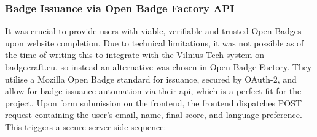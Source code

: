 \subsubsection{Badge Issuance via Open Badge Factory API}

It was crucial to provide users with viable, verifiable and trusted Open Badges upon website completion. 
Due to technical limitations, it was not possible as of the time of writing this to integrate with the Vilnius Tech system on badgecraft.eu, so instead an alternative was chosen in Open Badge Factory. 
They utilise a Mozilla Open Badge standard for issuance, secured by OAuth-2, and allow for badge issuance automation via their \acrshort{api}, which is a perfect fit for the project. 
Upon form submission on the frontend, the frontend dispatches POST request containing the user’s email, name, final score, and language preference. 
This triggers a secure server-side sequence:

